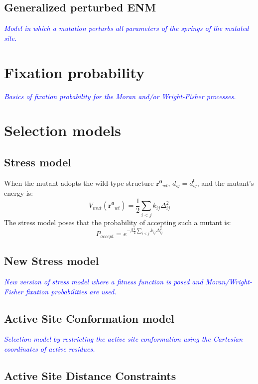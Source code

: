 \documentclass[12pt]{article}
\newcommand{\todo}[1]{\emph{\textcolor{blue} {#1}}}
\begin{document}
\subsection{Generalized perturbed ENM}

\todo{Model in which a mutation perturbs all parameters of the springs of the mutated site.}


\section{Fixation probability}
\todo{Basics of fixation probability for the Moran and/or Wright-Fisher processes.}


\section{Selection models}


\subsection{Stress model}

When the mutant adopts the wild-type structure $\mathbf{r^0}_{wt}$, $d_{ij} = d_{ij}^0$, and the mutant's energy is:
\begin{equation} \label{eq:Vmut0}
V_{mut}(\mathbf{r^0}_{wt}) = \frac{1}{2} \sum_{i<j} k_{ij} \Delta_{ij}^2
\end{equation}
The stress model poses that the probability of accepting such a mutant is:
\begin{equation} \label{eq:Paccept}
P_{accept} = e^{-\beta \frac{1}{2} \sum_{i<j} k_{ij} \Delta_{ij}^2}
\end{equation}

\subsection{New Stress model}

\todo{New version of stress model where a fitness function is posed and Moran/Wright-Fisher fixation probabilities are used.}

\subsection{Active Site Conformation model}

\todo{Selection model by restricting the active site conformation using the Cartesian coordinates of active residues.}

\subsection{Active Site Distance Constraints}
\end{document}
